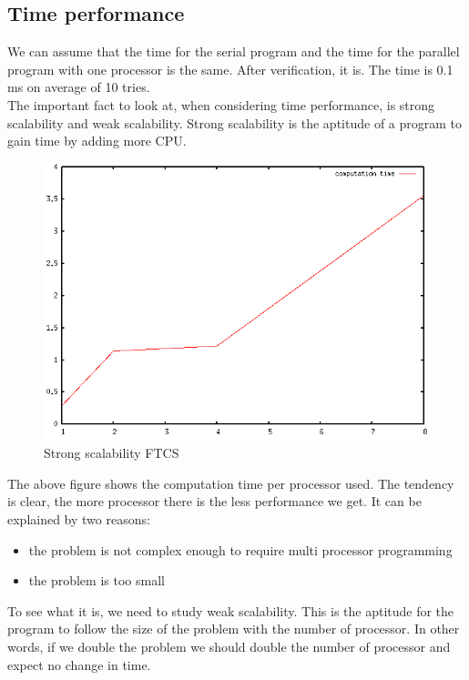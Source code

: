 \documentclass[12pt, a4paper]{report}
\begin{document}
\subsection{Time performance}
We can assume that the time for the serial program and the time for the parallel program with one processor is the same. After verification, it is. The time is 0.1 ms on average of 10 tries.\\
The important fact to look at, when considering time performance, is strong scalability and weak scalability. Strong scalability is the aptitude of a program to gain time by adding more CPU.\\
\begin{figure}[H]
\includegraphics[scale=0.5]{report/strongFTCS}
\caption{Strong scalability FTCS}
\end{figure}
The above figure shows the computation time per processor used. The tendency is clear, the more processor there is the less performance we get. It can be explained by two reasons:
\begin{itemize}
\item the problem is not complex enough to require multi processor programming
\item the problem is too small
\end{itemize} 
To see what it is, we need to study weak scalability. This is the aptitude for the program to follow the size of the problem with the number of processor. In other words, if we double the problem we should double the number of processor and expect no change in time.
\end{document}
